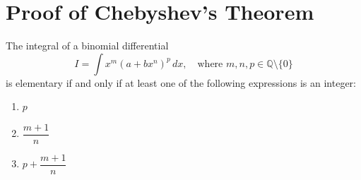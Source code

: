 \section{Proof of Chebyshev's Theorem}
\label{appendix:Chebyshev}

\begin{theorem}
The integral of a binomial differential
\[ I = \int x^m (a + bx^n)^p \, dx, \quad \text{where } m, n, p \in \mathbb{Q} \setminus \{0\} \]
is elementary if and only if at least one of the following expressions is an integer:
\begin{enumerate}[label=(\arabic*)]
    \item $p$
    \item $\dfrac{m+1}{n}$
    \item $p + \dfrac{m+1}{n}$
\end{enumerate}
\end{theorem}

